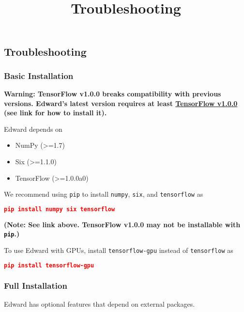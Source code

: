 \title{Troubleshooting}

\subsection{Troubleshooting}

\subsubsection{Basic Installation}

\textbf{Warning: TensorFlow v1.0.0 breaks
compatibility with previous versions.
Edward's latest version requires at least
\href{https://www.tensorflow.org/versions/r1.0/get_started/os_setup}{TensorFlow
v1.0.0} (see link for how to install it).
}

Edward depends on

\begin{itemize}
  \item NumPy (>=1.7)
  \item Six (>=1.1.0)
  \item TensorFlow (>=1.0.0a0)
\end{itemize}

We recommend using \texttt{pip} to install \texttt{numpy},
\texttt{six}, and \texttt{tensorflow} as

\begin{lstlisting}[language=JSON]
pip install numpy six tensorflow
\end{lstlisting}

\textbf{(Note: See link above. TensorFlow v1.0.0 may not be installable with
\texttt{pip}.)}

To use Edward with GPUs, install \texttt{tensorflow-gpu} instead of
\texttt{tensorflow} as

\begin{lstlisting}[language=JSON]
pip install tensorflow-gpu
\end{lstlisting}

\subsubsection{Full Installation}

Edward has optional features that depend on external packages.

